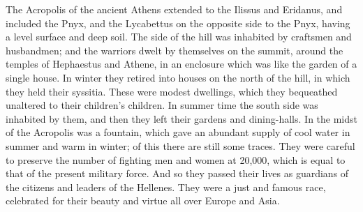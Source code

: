\documentclass[11pt,letter]{article}
\begin{document}
\par  The Acropolis of the ancient Athens extended to the Ilissus and Eridanus, and included the Pnyx, and the Lycabettus on the opposite side to the Pnyx, having a level surface and deep soil. The side of the hill was inhabited by craftsmen and husbandmen; and the warriors dwelt by themselves on the summit, around the temples of Hephaestus and Athene, in an enclosure which was like the garden of a single house. In winter they retired into houses on the north of the hill, in which they held their syssitia. These were modest dwellings, which they bequeathed unaltered to their children's children. In summer time the south side was inhabited by them, and then they left their gardens and dining-halls. In the midst of the Acropolis was a fountain, which gave an abundant supply of cool water in summer and warm in winter; of this there are still some traces. They were careful to preserve the number of fighting men and women at 20,000, which is equal to that of the present military force. And so they passed their lives as guardians of the citizens and leaders of the Hellenes. They were a just and famous race, celebrated for their beauty and virtue all over Europe and Asia.
\end{document}

